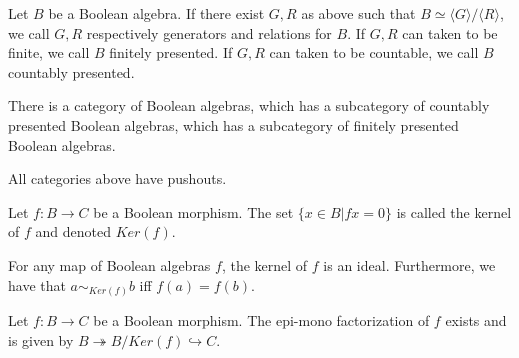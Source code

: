 \begin{definition}
  Let $B$ be a Boolean algebra. 
  If there exist $G, R$ as above such that 
  $B \simeq \langle G \rangle /\langle R \rangle$, 
  we call $G,R$ respectively generators and relations for $B$. 
  If $G,R$ can taken to be finite, we call $B$ finitely presented. 
  If $G,R$ can taken to be countable, we call $B$ countably presented. 
\end{definition}
\begin{remark}
  There is a category of Boolean algebras, which has a subcategory of countably presented Boolean algebras, 
  which has a subcategory of finitely presented Boolean algebras. 
\end{remark}
\begin{remark}\label{rmkBoolePushouts}
  All categories above have pushouts. 
\end{remark}
\begin{definition}
  Let $f:B\to C$ be a Boolean morphism. 
  The set $\{x \in B| fx = 0\}$ is called the kernel of $f$ and denoted 
  $Ker(f)$. 
\end{definition}
\begin{remark}
  For any map of Boolean algebras $f$, the kernel of $f$ is an ideal. 
  Furthermore, we have that $a\sim_{Ker(f)} b$ iff $f(a) = f(b)$. 
\end{remark}
\begin{remark}
  Let $f:B \to C$ be a Boolean morphism. 
  The epi-mono factorization of $f$ exists and is given by  
  $B \twoheadrightarrow B / Ker(f) \hookrightarrow C$.
\end{remark}

